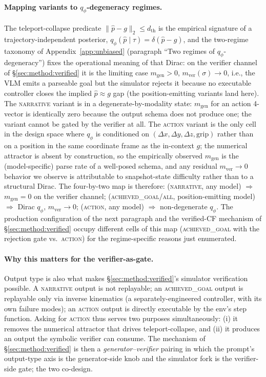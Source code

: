 \documentclass{article}
\begin{document}
\paragraph{Mapping variants to $q_\phi$-degeneracy regimes.}
The teleport-collapse predicate
$\|\hat{p}\!-\!g\|_2\!\le\!d_{\text{th}}$ is the empirical signature of a
trajectory-independent posterior, $q_\phi(\hat{p}\!\mid\!\tau)
\!=\!\delta(\hat{p}\!-\!g)$, and the two-regime taxonomy of
Appendix~\ref{app:unbiased} (paragraph ``Two regimes of $q_\phi$-degeneracy'')
fixes the operational meaning of that Dirac: on the verifier channel of
\S\ref{sec:method:verified} it is the limiting case $m_{\text{gen}}\!>\!0$,
$m_{\text{ver}}(\sigma)\!\to\!0$, i.e., the VLM emits a parseable goal but
the simulator rejects it because no executable controller closes the
implied $\hat{p}\!\approx\!g$ gap (the position-emitting variants land
here). The \textsc{narrative} variant is in a degenerate-by-modality
state: $m_{\text{gen}}$ for an action 4-vector is identically zero
because the output schema does not produce one; the variant cannot be
gated by the verifier at all. The \textsc{action} variant is the only
cell in the design space where $q_\phi$ is conditioned on
$(\Delta x, \Delta y, \Delta z, \text{grip})$ rather than on a position
in the same coordinate frame as the in-context $g$; the numerical
attractor is absent by construction, so the empirically observed
$m_{\text{gen}}$ is the (model-specific) parse rate of a well-posed
schema, and any residual $m_{\text{ver}}\!\to\!0$ behavior we observe is
attributable to snapshot-state difficulty rather than to a structural
Dirac. The four-by-two map is therefore: (\textsc{narrative}, any model)
$\Rightarrow$ $m_{\text{gen}}\!=\!0$ on the verifier channel;
(\textsc{achieved\_goal}/\textsc{all}, position-emitting model)
$\Rightarrow$ Dirac $q_\phi$, $m_{\text{ver}}\!\to\!0$;
(\textsc{action}, any model) $\Rightarrow$ non-degenerate $q_\phi$. The
production configuration of the next paragraph and the verified-CF
mechanism of \S\ref{sec:method:verified} occupy different cells of this
map (\textsc{achieved\_goal} with the rejection gate vs.\
\textsc{action}) for the regime-specific reasons just enumerated.

\paragraph{Why this matters for the verifier-as-gate.}
Output type is also what makes §\ref{sec:method:verified}'s simulator
verification possible. A \textsc{narrative} output is not replayable; an
\textsc{achieved\_goal} output is replayable only via inverse kinematics
(a separately-engineered controller, with its own failure modes); an
\textsc{action} output is directly executable by the env's step
function. Asking for \textsc{action} thus serves two purposes
simultaneously: (i) it removes the numerical attractor that drives
teleport-collapse, and (ii) it produces an output the symbolic verifier
can consume. The mechanism of §\ref{sec:method:verified} is then a
\emph{generator--verifier} pairing \citep{zha2025tango} in which the
prompt's output-type axis is the generator-side knob and the simulator
fork is the verifier-side gate; the two co-design.
\end{document}
